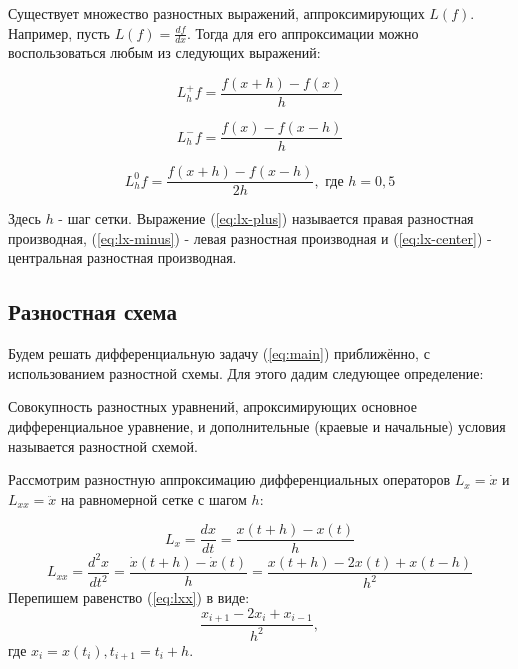 Существует множество разностных выражений, аппроксимирующих $L(f)$. Например, пусть $L(f) = \frac{df}{dx}$. Тогда для его
аппроксимации можно воспользоваться любым из следующих выражений:

\begin{equation}
    \label{eq:lx-plus}
    L_h^+f = \frac{f(x + h) - f(x)}{h}
\end{equation}

\begin{equation}
    \label{eq:lx-minus}
    L_h^-f = \frac{f(x) - f(x - h)}{h}
\end{equation}

\begin{equation}
    \label{eq:lx-center}
    L_h^0f = \frac{f(x + h) - f(x - h)}{2h}, \text{ где } h = 0,5
\end{equation}

\noindent Здесь $h$ - шаг сетки. Выражение (\ref{eq:lx-plus}) называется правая разностная производная, (\ref{eq:lx-minus})
- левая разностная производная и (\ref{eq:lx-center}) - центральная разностная производная.

\subsection{Разностная схема}

Будем решать дифференциальную задачу (\ref{eq:main}) приближённо, с использованием разностной схемы. Для этого дадим следующее
определение:

\begin{definition}
    Совокупность разностных уравнений, апроксимирующих основное дифференциальное уравнение, и дополнительные
    (краевые и начальные) условия называется разностной схемой.
\end{definition}

Рассмотрим разностную аппроксимацию дифференциальных операторов $L_x = \dot{x}$ и $L_{xx} = \ddot{x}$ на равномерной сетке
с шагом $h$:

\begin{equation}
    L_x = \frac{dx}{dt} = \frac{x(t + h) - x(t)}{h}
\end{equation}
\begin{equation}
    \label{eq:lxx}
    L_{xx} = \frac{d^2x}{dt^2} = \frac{\dot{x}(t + h) - \dot{x}(t)}{h} = \frac{x(t + h) - 2x(t) + x(t - h)}{h^2}
\end{equation}
Перепишем равенство (\ref{eq:lxx}) в виде:
\begin{equation}
    \label{eq:approximation}
    \frac{x_{i+1} - 2x_i + x_{i-1}}{h^2},
\end{equation}
где $x_i = x(t_i), t_{i+1} = t_i + h$.

